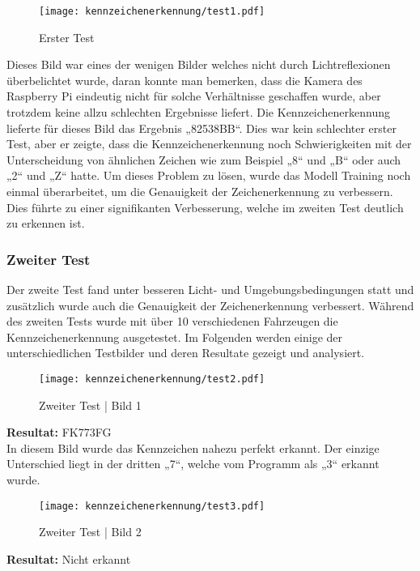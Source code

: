 \begin{figure}[H]
    \centering
    \texttt{[image: kennzeichenerkennung/test1.pdf]}
    \caption{Erster Test}
\end{figure}

Dieses Bild war eines der wenigen Bilder welches nicht durch Lichtreflexionen überbelichtet wurde, daran konnte man bemerken, dass die Kamera des Raspberry Pi eindeutig 
nicht für solche Verhältnisse geschaffen wurde, aber trotzdem keine allzu schlechten Ergebnisse liefert. Die Kennzeichenerkennung lieferte für dieses Bild das Ergebnis „82538BB“. 
Dies war kein schlechter erster Test, aber er zeigte, dass die Kennzeichenerkennung noch Schwierigkeiten mit der Unterscheidung von ähnlichen Zeichen wie zum Beispiel 
„8“ und „B“ oder auch „2“ und „Z“ hatte. Um dieses Problem zu lösen, wurde das Modell Training noch einmal überarbeitet, um die Genauigkeit der Zeichenerkennung zu verbessern. 
Dies führte zu einer signifikanten Verbesserung, welche im zweiten Test deutlich zu erkennen ist.

\subsubsection{Zweiter Test}
Der zweite Test fand unter besseren Licht- und Umgebungsbedingungen statt und zusätzlich wurde auch die Genauigkeit der Zeichenerkennung verbessert. 
Während des zweiten Tests wurde mit über 10 verschiedenen Fahrzeugen die Kennzeichenerkennung ausgetestet. Im Folgenden werden einige der unterschiedlichen Testbilder 
und deren Resultate gezeigt und analysiert.

\begin{figure}[H]
    \centering
    \texttt{[image: kennzeichenerkennung/test2.pdf]}
    \caption{Zweiter Test | Bild 1}
\end{figure}

\textbf{Resultat:} FK773FG\\

In diesem Bild wurde das Kennzeichen nahezu perfekt erkannt. Der einzige Unterschied liegt in der dritten „7“, welche vom Programm als „3“ erkannt wurde.

\begin{figure}[H]
    \centering
    \texttt{[image: kennzeichenerkennung/test3.pdf]}
    \caption{Zweiter Test | Bild 2}
\end{figure}

\textbf{Resultat:} Nicht erkannt\\

